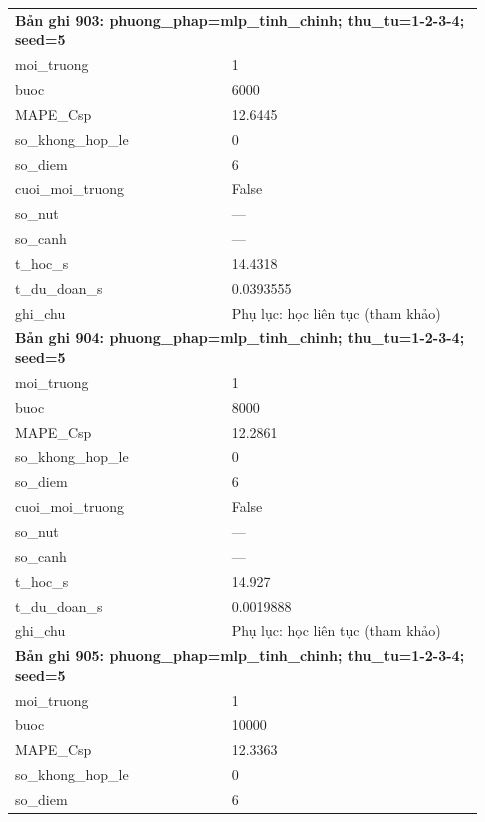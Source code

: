 \begin{longtable}{p{0.43\linewidth}p{0.50\linewidth}}
\midrule
\multicolumn{2}{p{0.95\linewidth}}{\textbf{Bản ghi 903: phuong\_phap=mlp\_tinh\_chinh; thu\_tu=1-2-3-4; seed=5}} \\
moi\_\allowbreak truong & 1 \\
buoc & 6000 \\
MAPE\_\allowbreak Csp & 12.6445 \\
so\_\allowbreak khong\_\allowbreak hop\_\allowbreak le & 0 \\
so\_\allowbreak diem & 6 \\
cuoi\_\allowbreak moi\_\allowbreak truong & False \\
so\_\allowbreak nut & — \\
so\_\allowbreak canh & — \\
t\_\allowbreak hoc\_\allowbreak s & 14.4318 \\
t\_\allowbreak du\_\allowbreak doan\_\allowbreak s & 0.0393555 \\
ghi\_\allowbreak chu & Phụ lục: học liên tục (tham khảo) \\
\midrule
\multicolumn{2}{p{0.95\linewidth}}{\textbf{Bản ghi 904: phuong\_phap=mlp\_tinh\_chinh; thu\_tu=1-2-3-4; seed=5}} \\
moi\_\allowbreak truong & 1 \\
buoc & 8000 \\
MAPE\_\allowbreak Csp & 12.2861 \\
so\_\allowbreak khong\_\allowbreak hop\_\allowbreak le & 0 \\
so\_\allowbreak diem & 6 \\
cuoi\_\allowbreak moi\_\allowbreak truong & False \\
so\_\allowbreak nut & — \\
so\_\allowbreak canh & — \\
t\_\allowbreak hoc\_\allowbreak s & 14.927 \\
t\_\allowbreak du\_\allowbreak doan\_\allowbreak s & 0.0019888 \\
ghi\_\allowbreak chu & Phụ lục: học liên tục (tham khảo) \\
\midrule
\multicolumn{2}{p{0.95\linewidth}}{\textbf{Bản ghi 905: phuong\_phap=mlp\_tinh\_chinh; thu\_tu=1-2-3-4; seed=5}} \\
moi\_\allowbreak truong & 1 \\
buoc & 10000 \\
MAPE\_\allowbreak Csp & 12.3363 \\
so\_\allowbreak khong\_\allowbreak hop\_\allowbreak le & 0 \\
so\_\allowbreak diem & 6 \\

\end{longtable}
